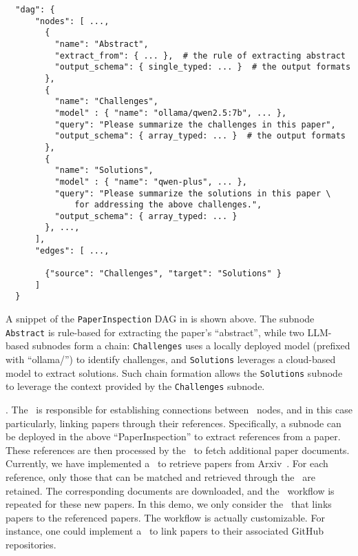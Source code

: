 \begin{lstlisting}
  "dag": {
      "nodes": [ ...,
        {
          "name": "Abstract",
          "extract_from": { ... },  # the rule of extracting abstract
          "output_schema": { single_typed: ... }  # the output formats
        },
        {
          "name": "Challenges",
          "model" : { "name": "ollama/qwen2.5:7b", ... },
          "query": "Please summarize the challenges in this paper",
          "output_schema": { array_typed: ... }  # the output formats
        },
        {
          "name": "Solutions",
          "model" : { "name": "qwen-plus", ... },
          "query": "Please summarize the solutions in this paper \
              for addressing the above challenges.",
          "output_schema": { array_typed: ... }
        }, ...,
      ],
      "edges": [ ...,

        {"source": "Challenges", "target": "Solutions" }
      ]
  }
  \end{lstlisting}

A snippet of the \texttt{PaperInspection} DAG in  is shown above. The subnode \texttt{Abstract} is rule-based for extracting the paper’s ``abstract'', while two LLM-based subnodes form a chain: \texttt{Challenges} uses a locally deployed model (prefixed with “ollama/”) to identify challenges, and \texttt{Solutions} leverages a cloud-based model to extract solutions. Such chain formation allows the \texttt{Solutions} subnode to leverage the context provided by the \texttt{Challenges} subnode.


. The \navigator\ is responsible for establishing connections between \fact\ nodes,
and in this case particularly, linking papers through their references. Specifically,  a subnode can be
deployed in the above ``PaperInspection'' to extract references from a paper.
These references are then processed by the \navigator\ to fetch additional paper documents. Currently, we have implemented a \navigator\ to retrieve papers from Arxiv~\cite{arxiv}. For each reference, only those that can be matched and retrieved through the \navigator\ are retained. The corresponding documents are downloaded, and the \inspector\ workflow is repeated for these new papers.
In this demo, we only consider the \navigator\ that links papers to the referenced papers. The workflow is actually customizable. For instance, one could implement a \navigator\ to link papers to their associated GitHub repositories.   %


